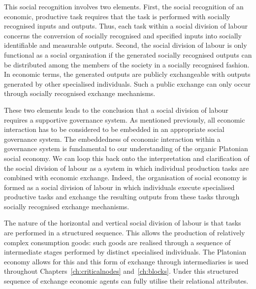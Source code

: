 This social recognition involves two elements. First, the social recognition of an economic, productive task requires that the task is performed with socially recognised inputs and outputs. Thus, each task within a social division of labour concerns the conversion of socially recognised and specified inputs into socially identifiable and measurable outputs. Second, the social division of labour is only functional as a social organisation if the generated socially recognised outputs can be distributed among the members of the society in a socially recognised fashion. In economic terms, the generated outputs are publicly exchangeable with outputs generated by other specialised individuals. Such a public exchange can only occur through socially recognised exchange mechanisms.

These two elements leads to the conclusion that a social division of labour requires a supportive governance system. As mentioned previously, all economic interaction has to be considered to be embedded in an appropriate social governance system. The embeddedness of economic interaction within a governance system is fundamental to our understanding of the organic Platonian social economy. We can loop this back onto the interpretation and clarification of the social division of labour as a system in which individual production tasks are combined with economic exchange. Indeed, the organisation of social economy is formed as a social division of labour in which individuals execute specialised productive tasks and exchange the resulting outputs from these tasks through socially recognised exchange mechanisms.

The nature of the horizontal and vertical social division of labour is that tasks are performed in a structured sequence. This allows the production of relatively complex consumption goods: such goods are realised through a sequence of intermediate stages performed by distinct specialised individuals. The Platonian economy allows for this and this form of exchange through intermediaries is used throughout Chapters~\ref{ch:criticalnodes} and~\ref{ch:blocks}. Under this structured sequence of exchange economic agents can fully utilise their relational attributes.

